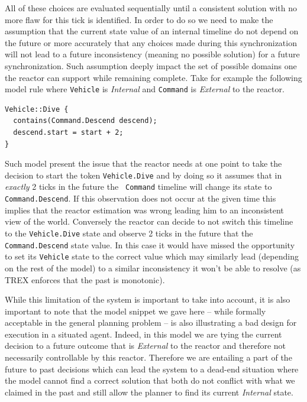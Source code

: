 All of these choices are evaluated sequentially until a consistent
solution with no more flaw for this tick is identified. In order to do
so we need to make the assumption that the current state value of an
internal timeline do not depend on the future or more accurately
that any choices made during this synchronization will not lead to a
future inconsistency (meaning no possible solution) for a future
synchronization. Such assumption deeply impact the set of possible
domains one the reactor can support while remaining complete. Take for
example the following model rule where {\tt Vehicle} is {\em Internal}
and {\tt Command} is {\em External} to the reactor.
\begin{verbatim}
Vehicle::Dive {
  contains(Command.Descend descend);
  descend.start = start + 2;
}
\end{verbatim}

Such model present the issue that the reactor needs at one point to
take the decision to start the token {\tt Vehicle.Dive} and by doing
so it assumes that in {\em exactly} 2 ticks in the future the {\tt
  Command} timeline will change its state to {\tt Command.Descend}. If
this observation does not occur at the given time this implies that
the reactor estimation was wrong leading him to an inconsistent view
of the world. Conversely the reactor can decide to not switch this
timeline to the {\tt Vehicle.Dive} state and observe 2 ticks in the
future that the {\tt Command.Descend} state value. In this case it
would have missed the opportunity to set its {\tt Vehicle} state to
the correct value which may similarly lead (depending on the rest of
the model) to a similar inconsistency it won't be able to resolve (as
TREX enforces that  the past is monotonic).

While this limitation of the system is important to take into account,
it is also important to note that the model snippet we gave here --
while formally acceptable in the general planning problem -- is also
illustrating a bad design for execution in a situated agent. Indeed,
in this model we are tying the current decision to a future outcome
that is {\em External} to the reactor and therefore not necessarily
controllable by this reactor. Therefore we are entailing a part of the
future to past decisions which can lead the system to a dead-end
situation where the model cannot find a correct solution that both do
not conflict with what we claimed in the past and still allow the
planner to find its current {\em Internal} state.

